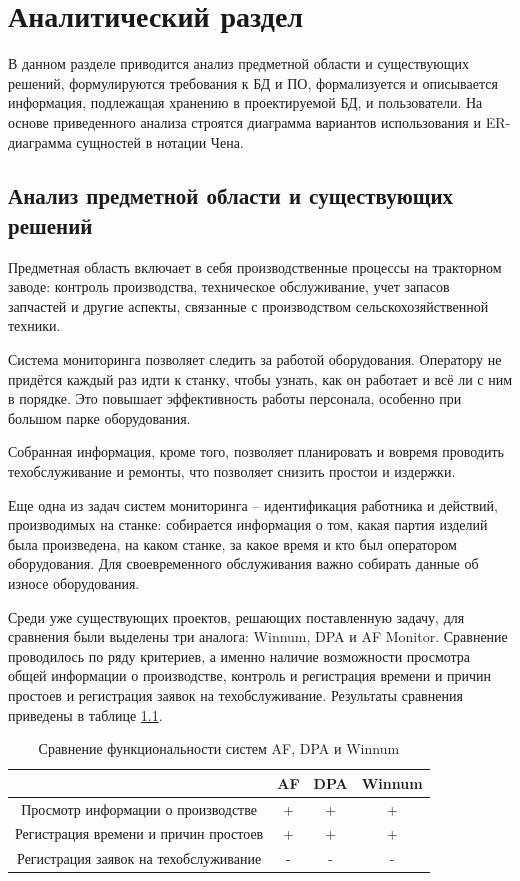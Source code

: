 \chapter{Аналитический раздел}

В данном разделе приводится анализ предметной области и существующих решений, формулируются требования к БД и ПО, формализуется и описывается информация, подлежащая хранению в проектируемой БД, и пользователи. На основе приведенного анализа строятся диаграмма вариантов использования и ER-диаграмма сущностей в нотации Чена.

\section{Анализ предметной области и существующих решений}

Предметная область включает в себя производственные процессы на тракторном заводе: контроль производства, техническое обслуживание, учет запасов запчастей и другие аспекты, связанные с производством сельскохозяйственной техники.

Система мониторинга позволяет следить за работой оборудования. Оператору не придётся каждый раз идти к станку, чтобы узнать, как он работает и всё ли с ним в порядке. Это повышает эффективность работы персонала, особенно при большом парке оборудования. 

Собранная информация, кроме того, позволяет планировать и вовремя проводить техобслуживание и ремонты, что позволяет снизить простои и издержки.

Еще одна из задач систем мониторинга -- идентификация работника и действий, производимых на станке: собирается информация о том, какая партия изделий была произведена, на каком станке, за какое время и кто был оператором оборудования. Для своевременного обслуживания важно собирать данные об износе оборудования.

Среди уже существующих проектов, решающих поставленную задачу, для сравнения были выделены три аналога: Winnum, DPA и AF Monitor. Сравнение проводилось по ряду критериев, а именно наличие возможности просмотра общей информации о производстве, контроль и регистрация времени и причин простоев и регистрация заявок на техобслуживание. Результаты сравнения приведены в таблице \ref{tab:functionality_comparison}.



\begin{table}[H]
  \centering
  \caption{Сравнение функциональности систем AF, DPA и Winnum}
  \label{tab:functionality_comparison}
  \small
  \begin{tabular}{|c|c|c|c|}
    \hline
    & \textbf{AF} & \textbf{DPA} & \textbf{Winnum} \\
    \hline
    Просмотр информации о производстве & + & + & + \\
    \hline
    Регистрация времени и причин простоев & + & + & + \\
    \hline
    Регистрация заявок на техобслуживание & - & - & - \\
    \hline
  \end{tabular}
\end{table}

